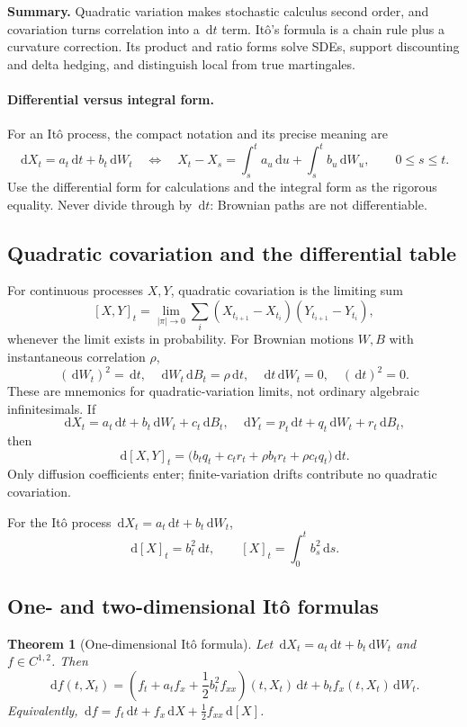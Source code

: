 \documentclass[11pt]{article}
\newcommand{\dd}{\,\mathrm{d}}
\newcommand{\1}{\mathbf{1}}
\theoremstyle{plain}
\newtheorem{theorem}{Theorem}[section]
\theoremstyle{definition}
\theoremstyle{remark}
\newcommand{\lecturesummary}[1]{%
\begin{center}
\begin{minipage}{0.95\linewidth}
\small\textbf{Summary.} #1
\end{minipage}
\end{center}
\vspace{0.5em}
}
\begin{document}
\lecturesummary{Quadratic variation makes stochastic calculus second order,
and covariation turns correlation into a $\dd t$ term. It\^o's formula is a
chain rule plus a curvature correction. Its product and ratio forms solve
SDEs, support discounting and delta hedging, and distinguish local from true
martingales.}

\paragraph{Differential versus integral form.}
For an It\^o process, the compact notation and its precise meaning are
\[
\boxed{
\dd X_t=a_t\dd t+b_t\dd W_t
\quad\Longleftrightarrow\quad
X_t-X_s=\int_s^t a_u\dd u+\int_s^t b_u\dd W_u,
\qquad 0\leq s\leq t.}
\]
Use the differential form for calculations and the integral form as the
rigorous equality. Never divide through by \(\dd t\): Brownian paths are not
differentiable.

\subsection{Quadratic covariation and the differential table}

For continuous processes \(X,Y\), quadratic covariation is the limiting sum
\[
[X,Y]_t=\lim_{|\pi|\to0}
\sum_i(X_{t_{i+1}}-X_{t_i})(Y_{t_{i+1}}-Y_{t_i}),
\]
whenever the limit exists in probability. For Brownian motions \(W,B\) with
instantaneous correlation \(\rho\),
\[
\boxed{
(\dd W_t)^2=\dd t,
\quad \dd W_t\dd B_t=\rho\dd t,
\quad \dd t\dd W_t=0,
\quad (\dd t)^2=0.}
\]
These are mnemonics for quadratic-variation limits, not ordinary algebraic
infinitesimals. If
\[
\dd X_t=a_t\dd t+b_t\dd W_t+c_t\dd B_t,
\quad
\dd Y_t=p_t\dd t+q_t\dd W_t+r_t\dd B_t,
\]
then
\[
\boxed{
\dd[X,Y]_t
=\bigl(b_tq_t+c_tr_t+\rho b_tr_t+\rho c_tq_t\bigr)\dd t.}
\]
Only diffusion coefficients enter; finite-variation drifts contribute no
quadratic covariation.

For the It\^o process
\(\dd X_t=a_t\dd t+b_t\dd W_t\),
\[
\boxed{\dd[X]_t=b_t^2\dd t,
\qquad [X]_t=\int_0^tb_s^2\dd s.}
\]

\subsection{One- and two-dimensional It\^o formulas}

\begin{theorem}[One-dimensional It\^o formula]
Let
\(\dd X_t=a_t\dd t+b_t\dd W_t\) and
\(f\in C^{1,2}\). Then
\[
\boxed{
\dd f(t,X_t)
=\left(f_t+a_tf_x+\frac12b_t^2f_{xx}\right)(t,X_t)\dd t
+b_tf_x(t,X_t)\dd W_t.}
\]
Equivalently,
\(\dd f=f_t\dd t+f_x\dd X+\tfrac12f_{xx}\dd[X]\).
\end{theorem}
\end{document}
